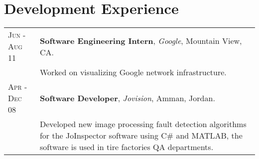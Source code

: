 \documentclass[a4paper, oneside, final]{scrartcl}
\newcommand{\twidthb}{12.65cm}
\newcommand{\twidtha}{3.0cm}
\begin{document}
\section{Development Experience}
\begin{tabular}{p{\twidtha}p{\twidthb}}
\textsc{Jun - Aug 11}  & \textbf{Software Engineering Intern}, \emph{Google}, Mountain View, CA. \\
						& \footnotesize{\parbox{\twidthb}{Worked on visualizing Google network infrastructure.}}
\\ \textsc{Apr - Dec 08}  & \textbf{Software Developer}, \emph{Jovision}, Amman, Jordan. \\
                         & \footnotesize{Developed new image processing fault detection algorithms for the JoInspector software using C\# and MATLAB, the software is used in tire factories QA departments.}

\end{tabular}
\end{document}
